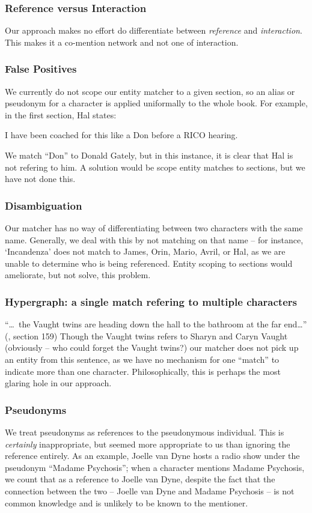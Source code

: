 \subsubsection{Reference versus Interaction}
Our approach makes no effort do differentiate between \textit{reference} and \textit{interaction}. This makes it a co-mention network and not one of interaction.

\subsubsection{False Positives}
We currently do not scope our entity matcher to a given section, so an alias or pseudonym for a character is applied uniformally to the whole book. For example, in the first section, Hal states:

\begin{displayquote}
I have been coached for this like a Don before a RICO hearing. 
\end{displayquote}

We match ``Don'' to Donald Gately, but in this instance, it is clear that Hal is not refering to him. A solution would be scope entity matches to sections, but we have not done this.

\subsubsection{Disambiguation}
Our matcher has no way of differentiating between two characters with the same name. Generally, we deal with this by not matching on that name -- for instance, `Incandenza' does not match to James, Orin, Mario, Avril, or Hal, as we are unable to determine who is being referenced. Entity scoping to sections would ameliorate, but not solve, this problem.

\subsubsection{Hypergraph: a single match refering to multiple characters}
``\ldots~the Vaught twins are heading down the hall to the bathroom at the far end\ldots'' (\infinitejest, section 159) Though the Vaught twins refers to Sharyn and Caryn Vaught (obviously -- who could forget the Vaught twins?) our matcher does not pick up an entity from this sentence, as we have no mechanism for one ``match'' to indicate more than one character. Philosophically, this is perhaps the most glaring hole in our approach.

\subsubsection{Pseudonyms}
We treat pseudonyms as references to the pseudonymous individual. This is \textit{certainly} inappropriate, but seemed more appropriate to us than ignoring the reference entirely. As an example, Joelle van Dyne hosts a radio show under the pseudonym ``Madame Psychosis''; when a character mentions Madame Psychosis, we count that as a reference to Joelle van Dyne, despite the fact that the connection between the two -- Joelle van Dyne and Madame Psychosis -- is not common knowledge and is unlikely to be known to the mentioner.

